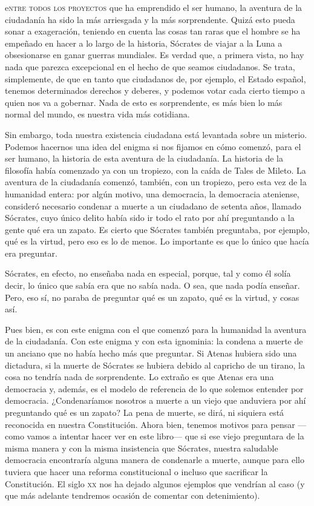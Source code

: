 \documentclass[draft,9pt,letterpaper,twocolumn,openany]{extbook}
\newcommand*\initfamily{\usefont{U}{Zallman}{xl}{n}}
\newcommand{\dcap}[2]{
	 \lettrine[nindent=0em,findent=2pt,lines=3,loversize=-0.10]{\initfamily #1}{#2}
 }
\newcommand{\notar}[1]{\marginnote{\small\sffamily #1}[-.8em]}
\begin{document}
\dcap{e}{ntre todos los proyectos}que ha emprendido el ser
humano, la aventura de la ciudadanía ha sido la más
arriesgada y la más sorprendente. Quizá esto pueda sonar
a exageración, teniendo en cuenta las cosas tan raras que
el hombre se ha empeñado en hacer a lo largo de la historia, Sócrates
de viajar a la Luna a obsesionarse en ganar guerras
mundiales. Es verdad que, a primera vista, no hay nada que
parezca excepcional en el hecho de que seamos ciudadanos.
Se trata, simplemente, de que en tanto que ciudadanos de,
por ejemplo, el Estado español, tenemos determinados
derechos y deberes, y podemos votar cada cierto tiempo a
quien nos va a gobernar. Nada de esto es sorprendente, es
más bien lo más normal del mundo, es nuestra vida más
cotidiana.

Sin embargo, toda nuestra existencia ciudadana está
levantada sobre un misterio. Podemos hacernos una idea
del enigma si nos fijamos en cómo comenzó, para el ser
humano, la historia de esta aventura de la ciudadanía.
La historia de la filosofía había comenzado ya con un
tropiezo, con la caída de Tales de Mileto. La aventura de la
ciudadanía comenzó, también, con un tropiezo, pero esta vez
de la humanidad entera: por algún motivo, una democracia,
la democracia ateniense, consideró necesario condenar a
muerte a un ciudadano de setenta años, llamado Sócrates,
cuyo único delito había sido ir todo el rato por ahí preguntando
a la gente qué era un zapato. Es cierto que Sócrates también
preguntaba, por ejemplo, qué es la virtud, pero eso es lo de
menos. Lo importante es que lo único que hacía era preguntar.

Sócrates, en efecto, no enseñaba nada en especial, porque,
tal y como él solía decir, lo único que sabía era que no sabía
nada. O sea, que nada podía enseñar. Pero, eso sí, no
paraba de preguntar qué es un zapato, qué es la virtud, y
cosas así.


Pues bien, es con este enigma con el que comenzó para
la humanidad la aventura de la ciudadanía. Con este
enigma y con esta ignominia: la condena a muerte de un
anciano que no había hecho más que preguntar. Si Atenas
hubiera sido una dictadura, si la muerte de Sócrates se
hubiera debido al capricho de un tirano, la cosa no tendría
nada de sorprendente. Lo extraño es que Atenas era una
democracia y, además, es el modelo de referencia de lo que
solemos entender por democracia. ¿Condenaríamos
nosotros a muerte a un viejo que anduviera por ahí
preguntando qué es un zapato? La pena de muerte, se dirá,
ni siquiera está reconocida en nuestra Constitución. Ahora
bien, tenemos motivos para pensar ---como vamos a intentar
hacer ver en este libro--- que si ese viejo preguntara de la
misma manera y con la misma insistencia que Sócrates,
nuestra saludable democracia encontraría alguna manera de
condenarle a muerte, aunque para ello tuviera que hacer
una reforma constitucional o incluso que sacrificar la
Constitución. El siglo \textsc{xx} nos ha dejado algunos ejemplos que
vendrían al caso (y que más adelante tendremos ocasión de
comentar con detenimiento).
\end{document}
